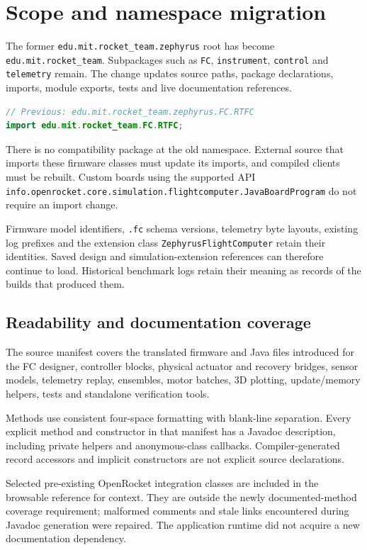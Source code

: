 \documentclass[10pt,letterpaper]{article}
\newcommand{\code}[1]{\nolinkurl{#1}}
\newcommand{\class}[1]{\nolinkurl{#1}}
\begin{document}
\section{Scope and namespace migration}
The former \code{edu.mit.rocket_team.zephyrus} root has become
\code{edu.mit.rocket_team}. Subpackages such as \code{FC}, \code{instrument},
\code{control} and \code{telemetry} remain. The change updates source paths,
package declarations, imports, module exports, tests and live documentation references.

\begin{lstlisting}[language=Java]
// Previous: edu.mit.rocket_team.zephyrus.FC.RTFC
import edu.mit.rocket_team.FC.RTFC;
\end{lstlisting}

There is no compatibility package at the old namespace. External source that
imports these firmware classes must update its imports, and compiled clients
must be rebuilt. Custom boards using the supported API
\code{info.openrocket.core.simulation.flightcomputer.JavaBoardProgram}
do not require an import change.

Firmware model identifiers, \code{.fc} schema versions, telemetry byte layouts,
existing log prefixes and the extension class \class{ZephyrusFlightComputer}
retain their identities. Saved design and simulation-extension references can
therefore continue to load. Historical benchmark logs retain their meaning as
records of the builds that produced them.

\subsection{Readability and documentation coverage}
The source manifest covers the translated firmware and Java files introduced
for the FC designer, controller blocks, physical actuator and recovery bridges,
sensor models, telemetry replay, ensembles, motor batches, 3D plotting,
update/memory helpers, tests and standalone verification tools.

Methods use consistent four-space formatting with blank-line separation.
Every explicit method and constructor in that manifest has a Javadoc description,
including private helpers and anonymous-class callbacks. Compiler-generated
record accessors and implicit constructors are not explicit source declarations.

Selected pre-existing OpenRocket integration classes are included in the
browsable reference for context. They are outside the newly documented-method
coverage requirement; malformed comments and stale links encountered during
Javadoc generation were repaired. The application runtime did not acquire a
new documentation dependency.
\end{document}
